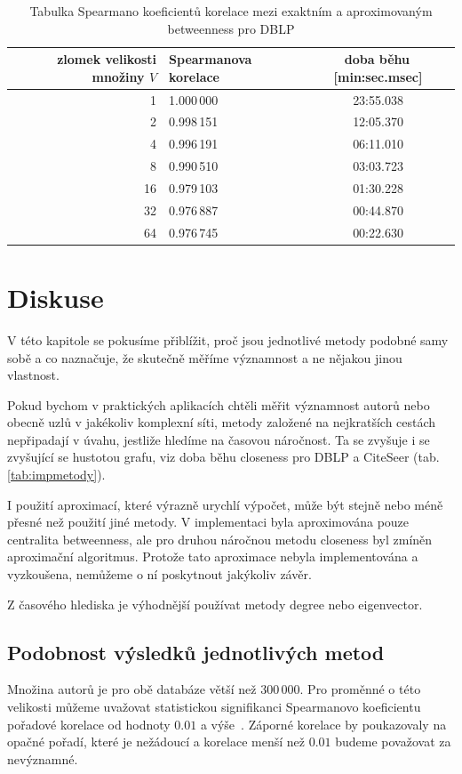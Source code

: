 \documentclass{bakalarka}
\begin{document}
\begin{table}[!ht]
\centering
\caption{Tabulka Spearmano koeficientů korelace mezi exaktním a aproximovaným betweenness pro DBLP}
\label{tab:btwA}
\begin{tabular}{r|l|c}
\toprule
zlomek velikosti množiny $V$ & Spearmanova korelace & doba běhu\,[min:sec.msec] \\
\midrule
1  & 1.000\,000 & 23:55.038\\
2  & 0.998\,151 & 12:05.370\\
4  & 0.996\,191 & 06:11.010\\
8  & 0.990\,510 & 03:03.723\\
16 & 0.979\,103 & 01:30.228\\
32 & 0.976\,887 & 00:44.870\\
64 & 0.976\,745 & 00:22.630\\
\bottomrule
\end{tabular}
\end{table}

\chapter{Diskuse}
V této kapitole se pokusíme přiblížit, proč jsou jednotlivé metody podobné samy
sobě a co naznačuje, že skutečně měříme významnost a ne nějakou jinou
vlastnost. 

Pokud bychom v praktických aplikacích chtěli měřit významnost autorů nebo
obecně uzlů v jakékoliv komplexní síti, metody založené na nejkratších cestách
nepřipadají v úvahu, jestliže hledíme na časovou náročnost. Ta se zvyšuje i se
zvyšující se hustotou grafu, viz doba běhu closeness pro DBLP a CiteSeer (tab.
\ref{tab:impmetody}).

I použití aproximací, které výrazně urychlí výpočet, může být stejně nebo méně
přesné než použití jiné metody. V implementaci byla aproximována pouze
centralita betweenness, ale pro druhou náročnou metodu closeness byl zmíněn
aproximační algoritmus. Protože tato aproximace nebyla implementována a
vyzkoušena, nemůžeme o ní poskytnout jakýkoliv závěr.

Z časového hlediska je výhodnější používat metody degree nebo eigenvector.

\section{Podobnost výsledků jednotlivých metod}
Množina autorů je pro obě databáze větší než 300\,000. Pro proměnné o této
velikosti můžeme uvažovat statistickou signifikanci Spearmanovo koeficientu
pořadové korelace od hodnoty $0.01$ a výše~\citep{yanding2009}.  Záporné
korelace by poukazovaly na opačné pořadí, které je nežádoucí a korelace menší
než $0.01$ budeme považovat za nevýznamné.
\end{document}
